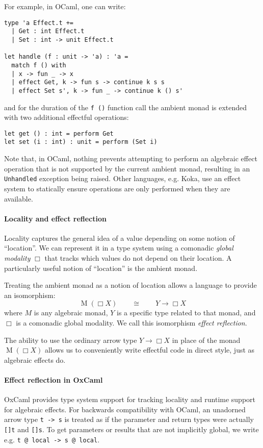 \documentclass[acmsmall, screen, nonacm]{acmart}
\newcommand{\glob}{\mathop{\Box}}
\begin{document}
For example, in OCaml, one can write:
\begin{lstlisting}[style=ocaml]
type 'a Effect.t +=
  | Get : int Effect.t
  | Set : int -> unit Effect.t

let handle (f : unit -> 'a) : 'a =
  match f () with
  | x -> fun _ -> x
  | effect Get, k -> fun s -> continue k s s
  | effect Set s', k -> fun _ -> continue k () s'
\end{lstlisting}
and for the duration of the \lstinline[style=ocaml]{f ()} function call
the ambient monad is extended with two additional effectful operations:
\begin{lstlisting}[style=ocaml]
let get () : int = perform Get
let set (i : int) : unit = perform (Set i)
\end{lstlisting}

Note that, in OCaml, nothing prevents attempting to perform an algebraic
effect operation that is not supported by the current ambient monad,
resulting in an \lstinline[style=ocaml]{Unhandled} exception being
raised. Other languages, e.g. Koka\cite{??}, use an effect system to
statically ensure operations are only performed when they are available.

\paragraph{Locality and effect reflection} Locality captures the general idea of a value
depending on some notion of ``location''. We can represent it in a type
system using a comonadic \emph{global modality} $\glob$ that tracks
which values do not depend on their location. A particularly useful
notion of ``location'' is the ambient monad.

Treating the ambient monad as a notion of location allows a language to
provide an isomorphism:
\begin{equation*}
  \mathop{M}(\glob X) \qquad \cong \qquad Y \mathbin{\rightarrow} \glob X
\end{equation*}
where $M$ is any algebraic monad, $Y$ is a specific type related to that
monad, and $\glob$ is a comonadic global modality. We call this
isomorphism \emph{effect reflection}.

The ability to use the ordinary arrow type
$Y \mathbin{\rightarrow} \glob X$ in place of the monad
$\mathop{M}(\glob X)$ allows us to conveniently write effectful
code in direct style, just as algebraic effects do.

\paragraph{Effect reflection in OxCaml}
OxCaml\cite{lorenzen2024oxidizing} provides type system support for
tracking locality and runtime support for algebraic effects. For
backwards compatibility with OCaml, an unadorned arrow type
\lstinline[style=ocaml]{t -> s} is treated as if the parameter and
return types were actually \lstinline[style=ocaml]{[]t} and
\lstinline[style=ocaml]{[]s}. To get parameters or results that are not
implicitly global, we write
e.g. \lstinline[style=ocaml]{t @ local -> s @ local}.
\end{document}
